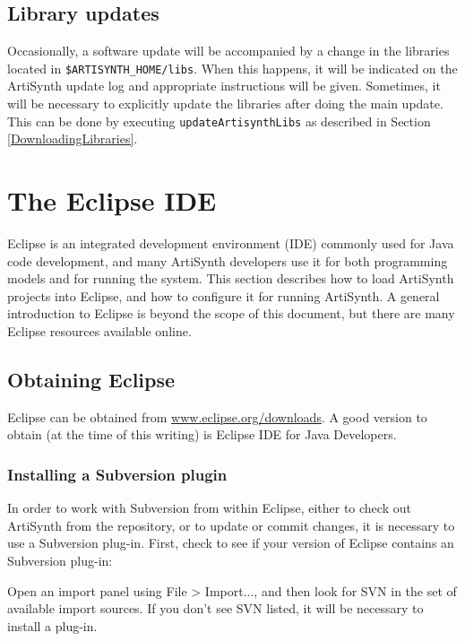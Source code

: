 \documentclass{article}
\def\SEP{/}
\begin{document}
\subsection{Library updates}

Occasionally, a software update will be accompanied by a change in the
libraries located in {\tt \$ARTISYNTH\_HOME\SEP libs}.  When this
happens, it will be indicated on the ArtiSynth update log and
appropriate instructions will be given. Sometimes, it will be
necessary to explicitly update the libraries after doing the main
update. This can be done by executing {\tt updateArtisynthLibs} as
described in Section \ref{DownloadingLibraries}.

\section{The Eclipse IDE}
\label{EclipseIDE}

Eclipse is an integrated development environment (IDE) commonly used
for Java code development, and many ArtiSynth developers use it for
both programming models and for running the system. This section
describes how to load ArtiSynth projects into Eclipse, and how to
configure it for running ArtiSynth. A general introduction to Eclipse
is beyond the scope of this document, but there are many Eclipse
resources available online.

\subsection{Obtaining Eclipse}

Eclipse can be obtained from
\href{http://www.eclipse.org/downloads}{www.eclipse.org/downloads}.  A
good version to obtain (at the time of this writing) is {\sf Eclipse
IDE for Java Developers}.

\subsubsection{Installing a Subversion plugin}

\label{SubversionPlugIn}

In order to work with Subversion from within Eclipse, either to check
out ArtiSynth from the repository, or to update or commit changes, it
is necessary to use a Subversion plug-in. First, check to see if your
version of Eclipse contains an Subversion plug-in:

Open an import panel using {\sf File > Import...}, and then look for
{\sf SVN} in the set of available import sources. If you don't see SVN
listed, it will be necessary to install a plug-in.
\end{document}
